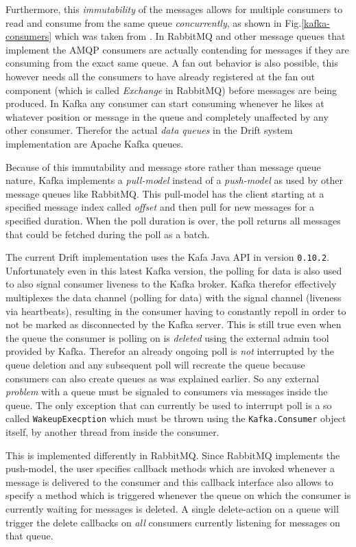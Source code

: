 Furthermore, this \textit{immutability} of the messages allows
for multiple consumers to read and consume from the same queue
\textit{concurrently}, as shown in Fig.\ref{kafka-consumers} which
was taken from \cite{kafka}.
In RabbitMQ and other message queues that
implement the AMQP consumers are actually contending for messages
if they are consuming from the exact same queue. A fan out behavior
is also possible, this however needs all the consumers to have already
registered at the fan out component (which is called \textit{Exchange}
in RabbitMQ) before messages are being produced.
In Kafka any consumer can start consuming whenever he likes at
whatever position or message in the queue and completely unaffected
by any other consumer. Therefor the actual \textit{data queues}
in the Drift system implementation are Apache Kafka queues.

Because of this immutability and message store rather
than message queue nature, Kafka implements a \textit{pull-model}
instead of a \textit{push-model} as used by other message queues
like RabbitMQ. This pull-model has the client starting at a
specified message index called \textit{offset} and then pull
for new messages for a specified duration. When the poll
duration is over, the poll returns all messages that could be
fetched during the poll as a batch.

The current Drift implementation uses the Kafa Java API in
version \texttt{0.10.2}.
Unfortunately even in this latest Kafka version, the polling for data is
also used to also signal consumer liveness to the Kafka broker.
Kafka therefor effectively multiplexes the data channel (polling for data)
with the signal channel (liveness via heartbeats), resulting
in the consumer having to constantly repoll in order to not
be marked as disconnected by the Kafka server.
This is still true even when the queue the consumer is polling
on is \textit{deleted} using the external admin tool provided
by Kafka. Therefor an already ongoing poll is \textit{not}
interrupted by the queue deletion and any subsequent poll will
recreate the queue because consumers can also create queues
as was explained earlier. So any external \textit{problem}
with a queue must be signaled to consumers via messages inside
the queue. The only exception that can currently be used to
interrupt poll is a so called \texttt{WakeupExecption} which
must be thrown using the \texttt{Kafka.Consumer} object itself,
by another thread from inside the consumer.
\newline

This is implemented differently in RabbitMQ. Since RabbitMQ
implements the push-model, the user specifies callback methods
which are invoked whenever a message is delivered to the
consumer and this callback interface also allows to specify
a method which is triggered whenever the queue on which the
consumer is currently waiting for messages is deleted.
A single delete-action on a queue will trigger the delete
callbacks on \textit{all} consumers currently listening for
messages on that queue.

